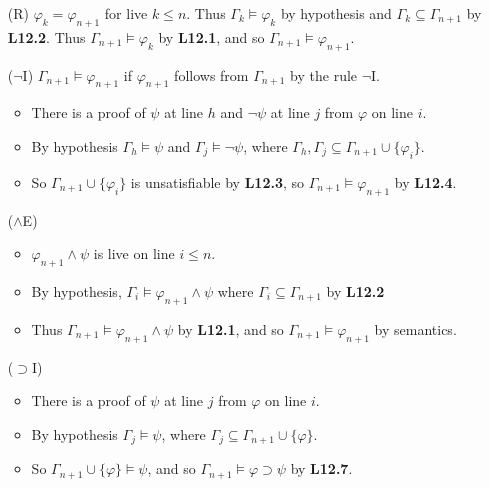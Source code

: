 \documentclass[a4paper, 11pt]{article} %
\newcommand{\set}[1]{\lbrace#1\rbrace} %
\renewcommand{\models}{\vDash}
\def\metaA{\ensuremath{\varphi}}
\def\metaB{\ensuremath{\psi}}
\begin{document}
\begin{enumerate}[labelsep=.1in]
  \item[(R)] $\metaA_k=\metaA_{n+1}$ for live $k\leq n$. Thus $\Gamma_k\models\metaA_k$ by hypothesis and $\Gamma_k\subseteq\Gamma_{n+1}$ by \textbf{L12.2}. Thus $\Gamma_{n+1}\models\metaA_k$ by \textbf{L12.1}, and so $\Gamma_{n+1}\models\metaA_{n+1}$.
  \item[($\neg$I)] $\Gamma_{n+1} \models \metaA_{n+1}$ if $\metaA_{n+1}$ follows from $\Gamma_{n+1}$ by the rule $\neg$I.
    \begin{itemize}
      \item There is a proof of $\metaB$ at line $h$ and $\neg\metaB$ at line $j$ from $\metaA$ on line $i$. 
      \item By hypothesis $\Gamma_h\models \metaB$ and $\Gamma_j\models\neg\metaB$, where $\Gamma_h,\Gamma_j\subseteq\Gamma_{n+1}\cup\set{\metaA_i}$.
      \item So $\Gamma_{n+1}\cup\set{\metaA_i}$ is unsatisfiable by \textbf{L12.3}, so $\Gamma_{n+1}\models\metaA_{n+1}$ by \textbf{L12.4}.
    \end{itemize}
  \item[($\wedge$E)]
    \begin{itemize}
      \item $\metaA_{n+1}\wedge\metaB$ is live on line $i\leq n$.
      \item By hypothesis, $\Gamma_i\models\metaA_{n+1}\wedge\metaB$ where $\Gamma_i\subseteq\Gamma_{n+1}$ by \textbf{L12.2}
      \item Thus $\Gamma_{n+1}\models\metaA_{n+1}\wedge\psi$ by \textbf{L12.1}, and so $\Gamma_{n+1}\models\metaA_{n+1}$ by semantics.
    \end{itemize}
  \item[($\supset$I)]
    \begin{itemize}
      \item There is a proof of $\metaB$ at line $j$ from $\metaA$ on line $i$. 
      \item By hypothesis $\Gamma_j\models \metaB$, where $\Gamma_j\subseteq\Gamma_{n+1}\cup\set{\metaA}$.
      \item So $\Gamma_{n+1}\cup\set{\metaA}\models\psi$, and so $\Gamma_{n+1}\models\metaA\supset\metaB$ by \textbf{L12.7}.
    \end{itemize}
\end{enumerate}
\end{document}
